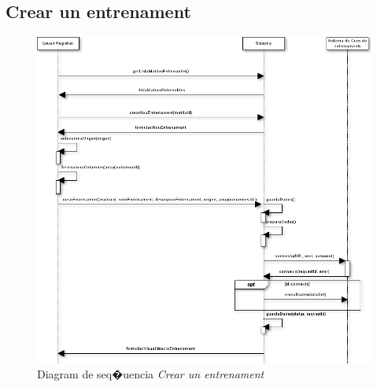 \subsection*{Crear un entrenament}
\begin{figure}[H]
  \centering
  \includegraphics[scale=0.6]{img/specification/SequenceCreateTraining.png}
  \caption{Diagram de seq�{u}encia \textit{Crear un entrenament}}
  \label{fig:sequenceaddtraining}
\end{figure}

